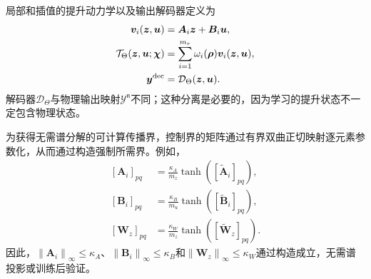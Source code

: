 \documentclass[journal]{IEEEtran}
\newcommand{\norm}[1]{\left\lVert #1\right\rVert}
\newcommand{\1}{\bm 1}
\begin{document}
局部和插值的提升动力学以及输出解码器定义为
\begin{equation}
\begin{aligned}
\bm v_i(\bm z,\bm u)&=\bm A_i\bm z+\bm B_i\bm u,\\
\mathcal T_\Theta(\bm z,\bm u;\bm\chi)
&=\sum_{i=1}^{m_r}\omega_i(\bm\rho)\bm v_i(\bm z,\bm u),\\
\bm y^{\rm dec}&=\mathcal D_\Theta(\bm z,\bm u).
\end{aligned}
\label{eq:fuzzy_transition}
\end{equation}
解码器$\mathcal D_\Theta$与物理输出映射$\mathcal Y^{\mathfrak n}$不同；这种分离是必要的，因为学习的提升状态不一定包含物理状态。

为获得无需谱分解的可计算传播界，控制界的矩阵通过有界双曲正切映射逐元素参数化，从而通过构造强制所需界。例如，
\begin{equation}
\begin{aligned}
[\bm A_i]_{pq}&=\frac{\kappa_A}{m_z}
\tanh([\widetilde{\bm A}_i]_{pq}),\\
[\bm B_i]_{pq}&=\frac{\kappa_B}{m_u}
\tanh([\widetilde{\bm B}_i]_{pq}),\\
[\bm W_z]_{pq}&=\frac{\kappa_W}{m_z}
\tanh([\widetilde{\bm W}_z]_{pq}).
\end{aligned}
\label{eq:hard_bounds}
\end{equation}
因此，$\norm{\bm A_i}_\infty\leq\kappa_A$、$\norm{\bm B_i}_\infty\leq\kappa_B$和$\norm{\bm W_z}_\infty\leq\kappa_W$通过构造成立，无需谱投影或训练后验证。
\end{document}
